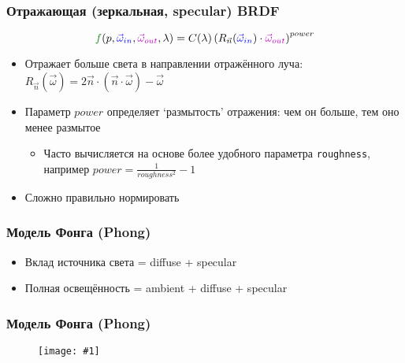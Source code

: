 \documentclass[10pt]{beamer}
\newcommand{\slideimage}[1]{
  \begin{figure}
    \begin{adjustbox}{width=\textwidth, totalheight=\textheight-2\baselineskip-2\baselineskip,keepaspectratio}
      \texttt{[image: \#1]}
    \end{adjustbox}
  \end{figure}
}
\begin{document}
\begin{frame}[fragile]
\frametitle{Отражающая (зеркальная, specular) BRDF}
\begin{equation*}
{\color{green}f}(p, {\color{blue}\vec\omega_{in}}, {\color{magenta}\vec\omega_{out}}, \lambda) = C(\lambda) \left(R_{\vec n}({\color{blue}\vec\omega_{in}})\cdot{\color{magenta}\vec\omega_{out}}\right)^{power}
\end{equation*}
\begin{itemize}
\item Отражает больше света в направлении отражённого луча: \begin{math}R_{\vec n}(\vec \omega) = 2\vec n \cdot (\vec n \cdot \vec \omega) - \vec \omega\end{math}
\item Параметр \begin{math}power\end{math} определяет `размытость' отражения: чем он больше, тем оно менее размытое
\begin{itemize}
\item Часто вычисляется на основе более удобного параметра \verb|roughness|, например \begin{math}power = \frac{1}{roughness^2}-1\end{math}
\end{itemize}
\item Сложно правильно нормировать
\end{itemize}
\end{frame}

\begin{frame}[fragile]
\frametitle{Модель Фонга (Phong)}
\begin{itemize}
\item Вклад источника света = diffuse + specular
\pause
\item Полная освещённость = ambient + diffuse + specular
\end{itemize}
\end{frame}

\begin{frame}[fragile]
\frametitle{Модель Фонга (Phong)}
\slideimage{phong.png}
\end{frame}
\end{document}
